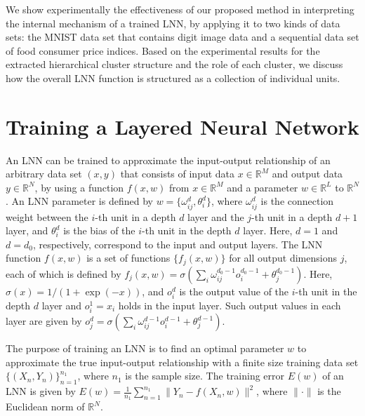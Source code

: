 \documentclass{article}
\begin{document}
We show experimentally the effectiveness of our proposed method in interpreting the internal mechanism of a trained LNN, by applying it to two kinds of data sets: the MNIST data set that contains digit image data and a sequential data set of food consumer price indices. Based on the experimental results for the extracted hierarchical cluster structure and the role of each cluster, we discuss how the overall LNN function is structured as a collection of individual units. 


\section{Training a Layered Neural Network}

An LNN can be trained to approximate the input-output relationship of an arbitrary data set $(x, y)$ that consists of input data $x\in \mathbb{R}^M$ and output data $y\in \mathbb{R}^N$, by using a function $f(x,w)$ from $x\in \mathbb{R}^M$ and a parameter $w\in \mathbb{R}^L$ to $\mathbb{R}^N$. An LNN parameter is defined by $w=\{\omega^d_{ij}, \theta^d_i\}$, where $\omega^d_{ij}$ is the connection weight between the $i$-th unit in a depth $d$ layer and the $j$-th unit in a depth $d+1$ layer, and $\theta^d_i$ is the bias of the $i$-th unit in the depth $d$ layer. Here, $d=1$ and $d=d_0$, respectively, correspond to the input and output layers. The LNN function $f(x,w)$ is a set of functions $\{f_j(x,w)\}$ for all output dimensions $j$, each of which is defined by $f_j(x,w) = \sigma(\sum_i \omega^{d_0-1}_{ij} o^{d_0-1}_i+\theta^{d_0-1}_j)$. Here, $\sigma (x)=1/(1+\exp (-x))$, and $o^d_i$ is the output value of the $i$-th unit in the depth $d$ layer and $o^1_i=x_i $ holds in the input layer. Such output values in each layer are given by $o^{d}_j= \sigma(\sum_i \omega^{d-1}_{ij} o^{d-1}_i+\theta^{d-1}_j)$. 

The purpose of training an LNN is to find an optimal parameter $w$ to approximate the true input-output relationship with a finite size training data set $\{(X_n,Y_n)\}_{n=1}^{n_1}$, where $n_1$ is the sample size. The training error $E(w)$ of an LNN is given by $E(w) = \frac{1}{n_1} \sum_{n=1}^{n_1} \|Y_n-f(X_n,w)\|^2$, where $\|\cdot\|$ is the Euclidean norm of $\mathbb{R}^N$. 
\end{document}
